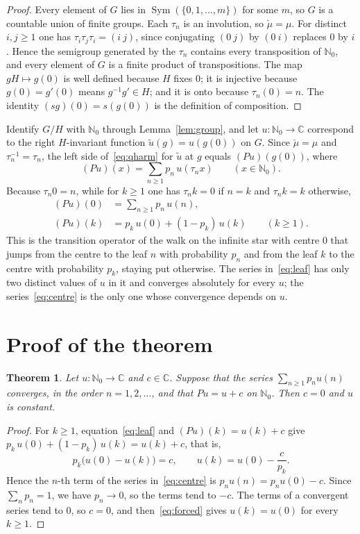 \documentclass[11pt]{amsart}
\newtheorem{theorem}{Theorem}[section]
\theoremstyle{definition}
\theoremstyle{remark}
\newcommand{\N}{\mathbb N}
\newcommand{\C}{\mathbb C}
\DeclareMathOperator{\Sym}{Sym}
\begin{document}
\begin{proof}
Every element of $G$ lies in $\Sym(\{0,1,\dots,m\})$ for some $m$, so $G$ is a countable union of finite groups. Each $\tau_n$ is an involution, so $\check\mu=\mu$. For distinct $i,j\ge1$ one has $\tau_i\tau_j\tau_i=(i\ j)$, since conjugating $(0\ j)$ by $(0\ i)$ replaces $0$ by $i$. Hence the semigroup generated by the $\tau_n$ contains every transposition of $\N_0$, and every element of $G$ is a finite product of transpositions. The map $gH\mapsto g(0)$ is well defined because $H$ fixes $0$; it is injective because $g(0)=g'(0)$ means $g^{-1}g'\in H$; and it is onto because $\tau_n(0)=n$. The identity $(sg)(0)=s(g(0))$ is the definition of composition.
\end{proof}

Identify $G/H$ with $\N_0$ through Lemma~\ref{lem:group}, and let $u\colon\N_0\to\C$ correspond to the right $H$-invariant function $\tilde u(g)=u(g(0))$ on $G$. Since $\check\mu=\mu$ and $\tau_n^{-1}=\tau_n$, the left side of~\eqref{eq:qharm} for $\tilde u$ at $g$ equals $(Pu)(g(0))$, where
\[
(Pu)(x)=\sum_{n\ge1}p_n\,u(\tau_n x)\qquad(x\in\N_0).
\]
Because $\tau_n0=n$, while for $k\ge1$ one has $\tau_nk=0$ if $n=k$ and $\tau_nk=k$ otherwise,
\begin{align}
(Pu)(0)&=\sum_{n\ge1}p_n\,u(n),\label{eq:centre}\\
(Pu)(k)&=p_k\,u(0)+(1-p_k)\,u(k)\qquad(k\ge1).\label{eq:leaf}
\end{align}
This is the transition operator of the walk on the infinite star with centre $0$ that jumps from the centre to the leaf $n$ with probability $p_n$ and from the leaf $k$ to the centre with probability $p_k$, staying put otherwise. The series in~\eqref{eq:leaf} has only two distinct values of $u$ in it and converges absolutely for every $u$; the series~\eqref{eq:centre} is the only one whose convergence depends on $u$.

\section{Proof of the theorem}\label{sec:proof}

\begin{theorem}\label{thm:star}
Let $u\colon\N_0\to\C$ and $c\in\C$. Suppose that the series $\sum_{n\ge1}p_nu(n)$ converges, in the order $n=1,2,\dots$, and that $Pu=u+c$ on $\N_0$. Then $c=0$ and $u$ is constant.
\end{theorem}

\begin{proof}
For $k\ge1$, equation~\eqref{eq:leaf} and $(Pu)(k)=u(k)+c$ give $p_k\,u(0)+(1-p_k)\,u(k)=u(k)+c$, that is,
\begin{equation}\label{eq:forced}
p_k\bigl(u(0)-u(k)\bigr)=c,\qquad u(k)=u(0)-\frac{c}{p_k}.
\end{equation}
Hence the $n$-th term of the series in~\eqref{eq:centre} is $p_nu(n)=p_nu(0)-c$. Since $\sum_np_n=1$, we have $p_n\to0$, so the terms tend to $-c$. The terms of a convergent series tend to $0$, so $c=0$, and then~\eqref{eq:forced} gives $u(k)=u(0)$ for every $k\ge1$.
\end{proof}
\end{document}

